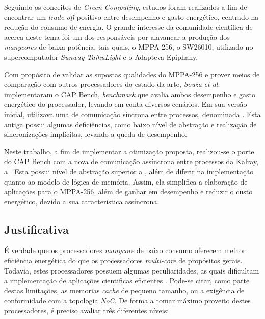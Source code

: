 \documentclass[a4paper,11pt]{article}
\newcommand{\etal}{\textit{et al}.\xspace}
\newcommand{\mppa}{MPPA-256\xspace}
\newcommand{\capb}{CAP Bench\xspace}
\newcommand{\epiphany}{Adapteva Epiphany\xspace}
\newcommand{\manycore}{\textit{manycore}\xspace}
\newcommand{\manycores}{\textit{manycores}\xspace}
\begin{document}
Seguindo os conceitos de \textit{Green Computing}, estudos foram realizados a fim de encontrar um \textit{trade-off} positivo entre desempenho e gasto energético, centrado na redução do consumo de energia. O grande interesse da comunidade científica de \hpc acerca deste tema foi um dos responsáveis por alavancar a produção dos \manycores de baixa potência, tais quais, o \mppa \cite{MPPA-2:2013}, o SW26010, utilizado no supercomputador \textit{Sunway TaihuLight} \cite{sunway:2016} e o \epiphany  \cite{Olofsson2014}.

Com propósito de validar as supostas qualidades do \mppa e prover meios de comparação com outros processadores do estado da arte, \textit{Souza} \etal implementaram o \capb \cite{Castro-Souza-CCPE:2016}, \textit{benchmark} que avalia ambos desempenho e gasto energético do processador, levando em conta diversos cenários. Em sua versão inicial, utilizava uma \api de comunicação síncrona entre processos, denominada \ipc \cite{MPPA-2:2013}. Esta antiga \api possui algumas deficiências, como baixo nível de abstração e realização de sincronizações implícitas, levando a queda de desempenho.

Neste trabalho, a fim de implementar a otimização proposta, realizou-se o porte do \capb com a nova \api de comunicação assíncrona entre processos da Kalray, a \async \cite{Hascoet2017}. Esta \api possui nível de abstração superior a \ipc, além de diferir na implementação quanto ao modelo de lógica de memória. Assim, ela simplifica a elaboração de aplicações para o \mppa, além de ganhar em desempenho e reduzir o custo energético, devido a sua característica assíncrona.

\subsection{Justificativa}

É verdade que os processadores \manycore de baixo consumo oferecem melhor eficiência energética do que os processadores \textit{multi-core} de propósitos gerais. Todavia, estes processadores possuem algumas peculiaridades, as quais dificultam a implementação de aplicações cientificas eficientes \cite{Castro:2013:ACE:2535753.2535757}. Pode-se citar, como parte destas limitações, as memorias \textit{cache} de pequeno tamanho, ou a exigência de conformidade com a topologia \textit{NoC}. De forma a tomar máximo proveito destes processadores, é preciso avaliar três diferentes níveis: 
\end{document}
